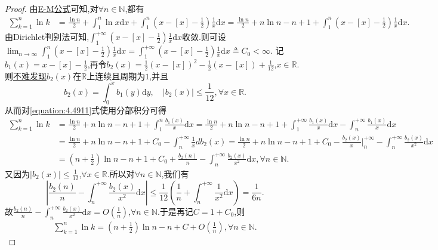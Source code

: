 \documentclass[../../main.tex]{subfiles}%
\begin{document}
\begin{proof}
由\hyperref[theorem:0阶Euler-Maclaurin公式(0阶E-M公式)]{E-M公式}可知,对\(\forall n\in\mathbb{N}\),都有
\begin{align}\label{equation:4.4911}
\sum_{k = 1}^n\ln k&=\frac{\ln n}{2}+\int_1^n\ln x\mathrm{d}x+\int_1^n\left(x - [x] - \frac{1}{2}\right)\frac{1}{x}\mathrm{d}x
=\frac{\ln n}{2}+n\ln n - n + 1+\int_1^n\left(x - [x] - \frac{1}{2}\right)\frac{1}{x}\mathrm{d}x.
\end{align}
由Dirichlet判别法可知,\(\int_1^{+\infty}\left(x - [x] - \frac{1}{2}\right)\frac{1}{x}\mathrm{d}x\)收敛.则可设\(\lim_{n\rightarrow\infty}\int_1^n\left(x - [x] - \frac{1}{2}\right)\frac{1}{x}\mathrm{d}x=\int_1^{+\infty}\left(x - [x] - \frac{1}{2}\right)\frac{1}{x}\mathrm{d}x\triangleq C_0<\infty\).
记\(b_1(x)=x - [x] - \frac{1}{2}\),再令\(b_2(x)=\frac{1}{2}(x - [x])^2 - \frac{1}{2}(x - [x]) + \frac{1}{12}\),\(x\in\mathbb{R}\).则\hyperlink{b2性质}{不难发现}\(b_2(x)\)在\(\mathbb{R}\)上连续且周期为\(1\),并且
\[
b_2(x)=\int_0^x{b_1(y)\mathrm{d}y}, \quad |b_2(x)|\leqslant\frac{1}{12}, \forall x\in\mathbb{R}.
\]
从而对\eqref{equation:4.4911}式使用分部积分可得
\begin{align*}
\sum_{k=1}^n{\ln k}&=\frac{\ln n}{2}+n\ln n-n+1+\int_1^n{\frac{b_1\left( x \right)}{x}\mathrm{d}x}=\frac{\ln n}{2}+n\ln n-n+1+\int_1^{+\infty}{\frac{b_1\left( x \right)}{x}\mathrm{d}x}-\int_n^{+\infty}{\frac{b_1\left( x \right)}{x}\mathrm{d}x}
\\
&=\frac{\ln n}{2}+n\ln n-n+1+C_0-\int_n^{+\infty}{\frac{1}{x}db_2\left( x \right)}=\frac{\ln n}{2}+n\ln n-n+1+C_0-\frac{b_2\left( x \right)}{x}\Big|_{n}^{+\infty}-\int_n^{+\infty}{\frac{b_2\left( x \right)}{x^2}\mathrm{d}x}
\\
&=\left( n+\frac{1}{2} \right) \ln n-n+1+C_0+\frac{b_2\left( n \right)}{n}-\int_n^{+\infty}{\frac{b_2\left( x \right)}{x^2}\mathrm{d}x},\forall n\in\mathbb{N}.
\end{align*}
又因为\(|b_2(x)|\leqslant\frac{1}{12}\),\(\forall x\in\mathbb{R}\).所以对\(\forall n\in\mathbb{N}\),我们有
\[
\left|\frac{b_2(n)}{n} - \int_n^{+\infty}\frac{b_2(x)}{x^2}\mathrm{d}x\right|\leqslant\frac{1}{12}\left(\frac{1}{n}+\int_n^{+\infty}\frac{1}{x^2}\mathrm{d}x\right)=\frac{1}{6n}.
\]
故\(\frac{b_2(n)}{n} - \int_n^{+\infty}\frac{b_2(x)}{x^2}\mathrm{d}x = O\left(\frac{1}{n}\right)\),\(\forall n\in\mathbb{N}\).于是再记\(C = 1 + C_0\),则
\begin{align}\label{equation:4491}
\sum_{k = 1}^n\ln k=\left(n + \frac{1}{2}\right)\ln n - n + C + O\left(\frac{1}{n}\right),\forall n\in\mathbb{N} .

\end{align}
\end{proof}
\end{document}
